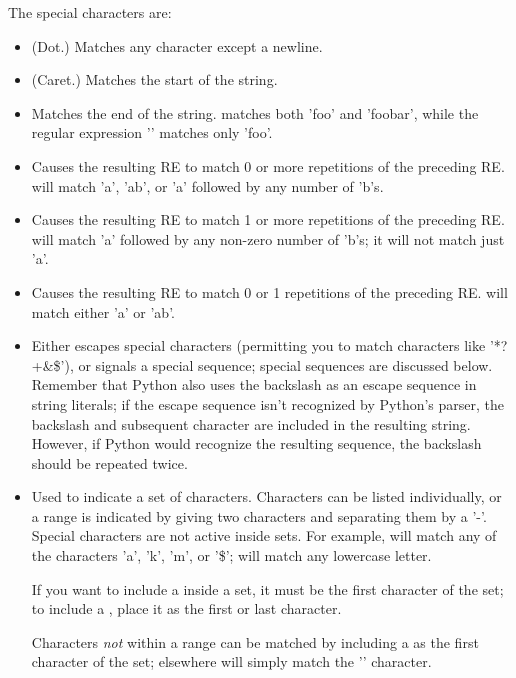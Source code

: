 The special characters are:
\begin{itemize}
\item[\code{.}] (Dot.)  Matches any character except a newline.
\item[\code{\^}] (Caret.)  Matches the start of the string.
\item[\code{\$}] Matches the end of the string.  
 matches both 'foo' and 'foobar', while the regular
expression '' matches only 'foo'.
\item[\code{*}] Causes the resulting RE to
match 0 or more repetitions of the preceding RE.   will
match 'a', 'ab', or 'a' followed by any number of 'b's.
\item[\code{+}] Causes the
resulting RE to match 1 or more repetitions of the preceding RE.
 will match 'a' followed by any non-zero number of 'b's; it
will not match just 'a'.
\item[\code{?}] Causes the resulting RE to
match 0 or 1 repetitions of the preceding RE.   will
match either 'a' or 'ab'.

\item[\code{\e}] Either escapes special characters (permitting you to match
characters like '*?+\&\$'), or signals a special sequence; special
sequences are discussed below.  Remember that Python also uses the
backslash as an escape sequence in string literals; if the escape
sequence isn't recognized by Python's parser, the backslash and
subsequent character are included in the resulting string.  However,
if Python would recognize the resulting sequence, the backslash should
be repeated twice.  

\item[\code{[]}] Used to indicate a set of characters.  Characters can
be listed individually, or a range is indicated by giving two
characters and separating them by a '-'.  Special characters are
not active inside sets.  For example, \code{[akm\$]}
will match any of the characters 'a', 'k', 'm', or '\$'; \code{[a-z]} will
match any lowercase letter.  

If you want to include a \code{]} inside a
set, it must be the first character of the set; to include a \code{-},
place it as the first or last character. 

Characters \emph{not} within a range can be matched by including a
\code{\^} as the first character of the set; \code{\^} elsewhere will
simply match the '\code{\^}' character.  
\end{itemize}


